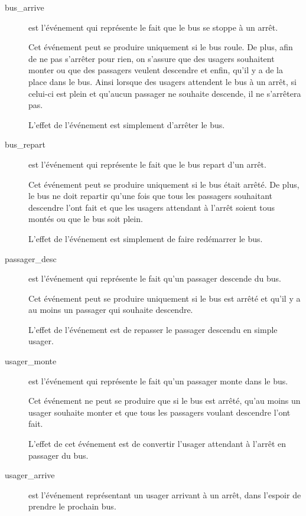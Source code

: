 ﻿\documentclass[a4paper,titlepage]{report}
\begin{document}
		\begin{description}
			\item[bus\_arrive] est l'événement qui représente le fait que le bus se stoppe à un arrêt.
			
			Cet événement peut se produire uniquement si le bus roule. De plus, afin de ne pas s'arrêter pour rien, on s'assure que des usagers souhaitent monter ou que des passagers veulent descendre et enfin, qu'il y a de la place dans le bus. Ainsi lorsque des usagers attendent le bus à un arrêt, si celui-ci est plein et qu’aucun passager ne souhaite descende, il ne s'arrêtera pas.
			
			L'effet de l'événement est simplement d'arrêter le bus.\\
		
			\item[bus\_repart] est l'événement qui représente le fait que le bus repart d'un arrêt.
			
			Cet événement peut se produire uniquement si le bus était arrêté. De plus, le bus ne doit repartir qu'une fois que tous les passagers souhaitant descendre l'ont fait et que les usagers attendant à l'arrêt soient tous montés ou que le bus soit plein.
			
			L'effet de l'événement est simplement de faire redémarrer le bus.\\
			
			\item[passager\_desc] est l'événement qui représente le fait qu'un passager descende du bus.
			
			Cet événement peut se produire uniquement si le bus est arrêté et qu'il y a au moins un passager qui souhaite descendre.
			
			L'effet de l'événement est de repasser le passager descendu en simple usager. \\
			
			\item[usager\_monte] est l'événement qui représente le fait qu'un passager monte dans le bus.
			
			Cet événement ne peut se produire que si le bus est arrêté, qu'au moins un usager souhaite monter et que tous les passagers voulant descendre l'ont fait.
			
			L'effet de cet événement est de convertir l'usager attendant à l'arrêt en passager du bus.\\
			
			\item[usager\_arrive] est l'événement représentant un usager arrivant à un arrêt, dans l'espoir de prendre le prochain bus.
			

\end{description}
\end{document}
